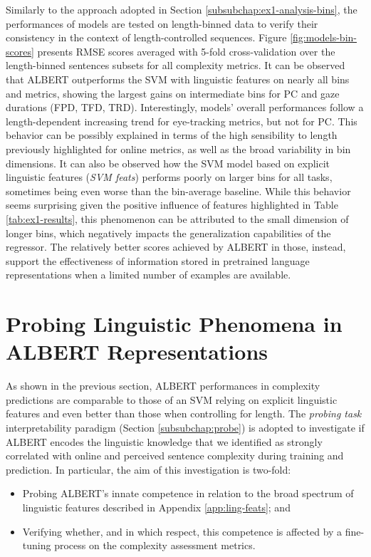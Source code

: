 \documentclass[a4paper, nobind]{templates/ociamthesis}
\begin{document}
Similarly to the approach adopted in Section \ref{subsubchap:ex1-analysis-bins}, the performances of models are tested on length-binned data to verify their consistency in the context of length-controlled sequences. Figure \ref{fig:models-bin-scores} presents RMSE scores averaged with 5-fold cross-validation over the length-binned sentences subsets for all complexity metrics. It can be observed that ALBERT outperforms the SVM with linguistic features on nearly all bins and metrics, showing the largest gains on intermediate bins for PC and gaze durations (FPD, TFD, TRD). Interestingly, models' overall performances follow a length-dependent increasing trend for eye-tracking metrics, but not for PC. This behavior can be possibly explained in terms of the high sensibility to length previously highlighted for online metrics, as well as the broad variability in bin dimensions. It can also be observed how the SVM model based on explicit linguistic features (\emph{SVM feats}) performs poorly on larger bins for all tasks, sometimes being even worse than the bin-average baseline. While this behavior seems surprising given the positive influence of features highlighted in Table \ref{tab:ex1-results}, this phenomenon can be attributed to the small dimension of longer bins, which negatively impacts the generalization capabilities of the regressor. The relatively better scores achieved by ALBERT in those, instead, support the effectiveness of information stored in pretrained language representations when a limited number of examples are available.

\hypertarget{subchap:ex1-probing}{%
\section{Probing Linguistic Phenomena in ALBERT Representations}\label{subchap:ex1-probing}}

As shown in the previous section, ALBERT performances in complexity predictions are comparable to those of an SVM relying on explicit linguistic features and even better than those when controlling for length. The \emph{probing task} interpretability paradigm (Section \ref{subsubchap:probe}) is adopted to investigate if ALBERT encodes the linguistic knowledge that we identified as strongly correlated with online and perceived sentence complexity during training and prediction. In particular, the aim of this investigation is two-fold:

\begin{itemize}
\item
  Probing ALBERT's innate competence in relation to the broad spectrum of linguistic features described in Appendix \ref{app:ling-feats}; and
\item
  Verifying whether, and in which respect, this competence is affected by a fine-tuning process on the complexity assessment metrics.
\end{itemize}
\end{document}
